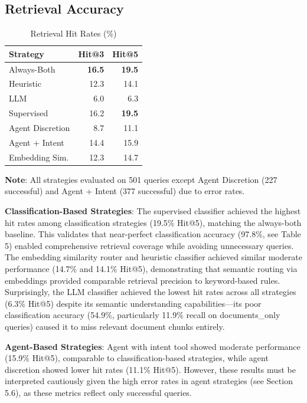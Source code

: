 \documentclass[twocolumn,10pt]{article}
\begin{document}
\subsection{Retrieval Accuracy}

\begin{table}[h]
\centering
\caption{Retrieval Hit Rates (\%)}
\small
\begin{tabular}{lrr}
\toprule
Strategy & Hit@3 & Hit@5 \\
\midrule
Always-Both & \textbf{16.5} & \textbf{19.5} \\
Heuristic & 12.3 & 14.1 \\
LLM & 6.0 & 6.3 \\
Supervised & 16.2 & \textbf{19.5} \\
Agent Discretion & 8.7 & 11.1 \\
Agent + Intent & 14.4 & 15.9 \\
Embedding Sim. & 12.3 & 14.7 \\
\bottomrule
\end{tabular}
\end{table}

\textbf{Note}: All strategies evaluated on 501 queries except Agent Discretion (227 successful) and Agent + Intent (377 successful) due to error rates.

\textbf{Classification-Based Strategies}: The supervised classifier achieved the highest hit rates among classification strategies (19.5\% Hit@5), matching the always-both baseline. This validates that near-perfect classification accuracy (97.8\%, see Table 5) enabled comprehensive retrieval coverage while avoiding unnecessary queries. The embedding similarity router and heuristic classifier achieved similar moderate performance (14.7\% and 14.1\% Hit@5), demonstrating that semantic routing via embeddings provided comparable retrieval precision to keyword-based rules. Surprisingly, the LLM classifier achieved the lowest hit rates across all strategies (6.3\% Hit@5) despite its semantic understanding capabilities---its poor classification accuracy (54.9\%, particularly 11.9\% recall on documents\_only queries) caused it to miss relevant document chunks entirely.

\textbf{Agent-Based Strategies}: Agent with intent tool showed moderate performance (15.9\% Hit@5), comparable to classification-based strategies, while agent discretion showed lower hit rates (11.1\% Hit@5). However, these results must be interpreted cautiously given the high error rates in agent strategies (see Section 5.6), as these metrics reflect only successful queries.
\end{document}
